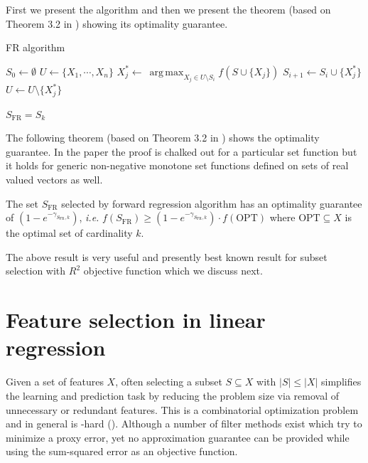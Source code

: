 First we present the algorithm and then we present the theorem (based on Theorem 3.2 in \citealp{DasDK11}) showing its optimality guarantee.

\begin{algorithm}
FR algorithm
\begin{algorithmic}[1]
\State $S_0\gets \emptyset$
\State $U\gets \{X_1,\cdots,X_n\}$
  \State $X^*_j\gets\ \operatorname*{arg\,max}_{X_j\in U\setminus S_i} f(S\cup \{X_j\})$
  \State $S_{i+1}\gets S_i\cup \{X^*_j\}$
  \State $U\gets U\setminus \{X^*_j\}$
\EndFor
\end{algorithmic}
\Return $S_{\text{FR}}=S_k$
\end{algorithm}

\noindent The following theorem (based on Theorem 3.2 in \citealp{DasDK11}) shows the optimality guarantee. In the paper the proof is chalked out for a particular set function but it holds for generic non-negative monotone set functions defined on sets of real valued vectors as well.

\begin{theorem}
\label{thm:optimality}
 The set $S_{\text{FR}}$ selected by forward regression algorithm has an optimality guarantee of $(1-e^{-\gamma_{S_{\text{FR}},k}})$, \textit{i.e.} $f(S_{\text{FR}})\ge (1-e^{-\gamma_{S_{\text{FR}},k}})\cdot f(\text{OPT})$ where $\text{OPT}\subseteq X$ is the optimal set of cardinality $k$.
\end{theorem}

\noindent The above result is very useful and presently best known result for subset selection with $R^2$ objective function which we discuss next.

\section{Feature selection in linear regression}
\label{section:featsel}
Given a set of features $X$, often selecting a subset $S\subseteq X$ with $|S|\le |X|$ simplifies the learning and prediction task by reducing the problem size via removal of unnecessary or redundant features. This is a combinatorial optimization problem and in general is \NP-hard (\citealp{Amaldi:1998:AMN:292475.292496}). Although a number of filter methods exist which try to minimize a proxy error, yet no approximation guarantee can be provided while using the sum-squared error as an objective function.

